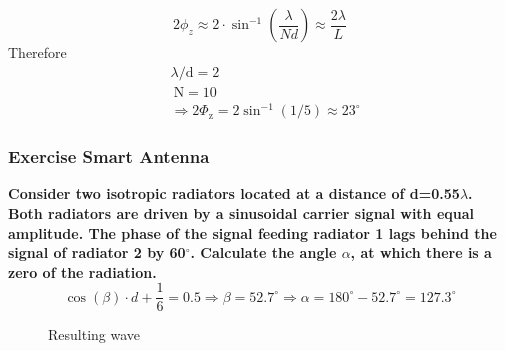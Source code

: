 $$
2 \phi_z \approx 2 \cdot \sin ^{-1}\left(\frac{\lambda}{N d}\right) \approx \frac{2 \lambda}{L}
$$
Therefore
$$
\begin{aligned}
&\lambda / \mathrm{d}=2 \\
&\mathrm{~N}=10 \\
&\Rightarrow 2 \Phi_{\mathrm{z}}=2 \sin ^{-1}(1 / 5) \approx 23^{\circ}
\end{aligned}
$$
\subsubsection{Exercise Smart Antenna}
\textbf{Consider two isotropic radiators located at a distance of d=0.55$\lambda$. Both radiators are driven by a sinusoidal carrier signal with equal amplitude. The phase of the signal feeding radiator 1 lags behind  the signal of radiator 2 by 60$^{\circ}$. Calculate the angle $\alpha$, at which there is a zero of the radiation.}
$$
\cos(\beta)\cdot d + \frac{1}{6}=0.5 \Rightarrow \beta = 52.7^{\circ} \Rightarrow \alpha=180^{\circ}-52.7^{\circ}=127.3^{\circ}
$$
\begin{figure}[ht!]
  \centering
  \caption{Resulting wave}
  \label{fig:smart_antenna}
\end{figure}
